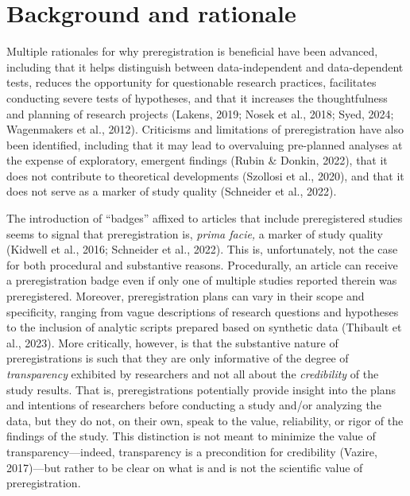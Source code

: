 \documentclass[authordate, meta]{jote-new-article}
\begin{document}
	\section{\textbf{Background and rationale}}



	Multiple rationales for why preregistration is beneficial have been advanced, including that it helps distinguish between data-independent and data-dependent tests, reduces the opportunity for questionable research practices, facilitates conducting severe tests of hypotheses, and that it increases the thoughtfulness and planning of research projects (Lakens, 2019; Nosek et al., 2018; Syed, 2024; Wagenmakers et al., 2012). Criticisms and limitations of preregistration have also been identified, including that it may lead to overvaluing pre-planned analyses at the expense of exploratory, emergent findings (Rubin \& Donkin, 2022), that it does not contribute to theoretical developments (Szollosi et al., 2020), and that it does not serve as a marker of study quality (Schneider et al., 2022).



	The introduction of “badges” affixed to articles that include preregistered studies seems to signal that preregistration is, \emph{prima facie,} a marker of study quality (Kidwell et al., 2016; Schneider et al., 2022). This is, unfortunately, not the case for both procedural and substantive reasons. Procedurally, an article can receive a preregistration badge even if only one of multiple studies reported therein was preregistered. Moreover, preregistration plans can vary in their scope and specificity, ranging from vague descriptions of research questions and hypotheses to the inclusion of analytic scripts prepared based on synthetic data (Thibault et al., 2023). More critically, however, is that the substantive nature of preregistrations is such that they are only informative of the degree of \emph{transparency} exhibited by researchers and not all about the \emph{credibility} of the study results. That is, preregistrations potentially provide insight into the plans and intentions of researchers before conducting a study and/or analyzing the data, but they do not, on their own, speak to the value, reliability, or rigor of the findings of the study. This distinction is not meant to minimize the value of transparency—indeed, transparency is a precondition for credibility (Vazire, 2017)—but rather to be clear on what is and is not the scientific value of preregistration.
\end{document}
